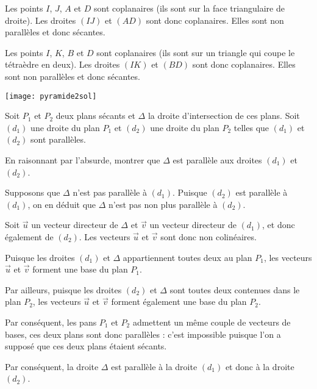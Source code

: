 \documentclass[11pt,fleqn, openany]{book} %
\begin{document}
\begin{solution}Les points $I$, $J$, $A$ et $D$ sont coplanaires (ils sont sur la face triangulaire de droite). Les droites $(IJ)$ et $(AD)$ sont donc coplanaires. Elles sont non parallèles et donc sécantes.

Les points $I$, $K$, $B$ et $D$ sont coplanaires (ils sont sur un triangle qui coupe le tétraèdre en deux). Les droites $(IK)$ et $(BD)$ sont donc coplanaires. Elles sont non parallèles et donc sécantes.

\begin{center}
\texttt{[image: pyramide2sol]}
\end{center}\end{solution}


\begin{exercise}[subtitle={(Théorème du toit)}]
Soit $P_1$ et $P_2$ deux plans sécants et $\Delta$ la droite d'intersection de ces plans. Soit $(d_1)$ une droite du plan $P_1$ et $(d_2)$ une droite du plan $P_2$ telles que $(d_1)$ et $(d_2)$ sont parallèles.

En raisonnant par l'absurde, montrer que $\Delta$ est parallèle aux droites $(d_1)$ et $(d_2)$.

\end{exercise}

\begin{solution}
Supposons que $\Delta$ n'est pas parallèle à $(d_1)$. Puisque $(d_2)$ est parallèle à $(d_1)$, on en déduit que $\Delta$ n'est pas non plus parallèle à $(d_2)$.

Soit $\vec u$ un vecteur directeur de $\Delta$ et $\vec v$ un vecteur directeur de $(d_1)$, et donc également de $(d_2)$. Les vecteurs $\vec u$ et $\vec v$ sont donc non colinéaires.

Puisque les droites $(d_1)$ et $\Delta$ appartiennent toutes deux au plan $P_1$, les vecteurs $\vec u$ et $\vec v$ forment une base du plan $P_1$.

Par ailleurs, puisque les droites $(d_2)$ et $\Delta$ sont toutes deux contenues dans le plan $P_2$, les vecteurs $\vec u$ et $\vec v$ forment également une base du plan $P_2$. 

Par conséquent, les pans $P_1$ et $P_2$ admettent un même couple de vecteurs de bases, ces deux plans sont donc parallèles : c'est impossible puisque l'on a supposé que ces deux plans étaient sécants.

Par conséquent, la droite $\Delta$ est parallèle à la droite $(d_1)$ et donc à la droite $(d_2)$.
\end{solution}
\end{document}
